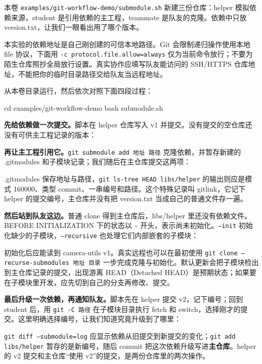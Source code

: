 本卷 \texttt{examples/git-workflow-demo/submodule.sh} 新建三份仓库：helper 模拟依赖来源，student 是引用依赖的主工程，teammate 是队友的克隆。依赖中只放 version.txt，让我们一眼看出用了哪个版本。
\begin{note}
本实验的依赖地址是自己刚创建的可信本地路径。Git 会限制递归操作使用本地 file 协议，下面用 \texttt{-c protocol.file.allow=always} 仅为当前命令放行；不要为陌生仓库照抄全局放行设置。真实协作应填写队友能访问的 SSH/HTTPS 仓库地址，不能把你的临时目录路径交给队友当远程地址。
\end{note}
\begin{example}[加入、克隆与更新相机工具子模块]
从本卷目录运行，然后依次对照下面四段过程：
\begin{tbash}
cd examples/git-workflow-demo
bash submodule.sh
\end{tbash}

\textbf{先给依赖做一次提交。}脚本在 helper 仓库写入 v1 并提交。没有提交的空仓库还没有可供主工程记录的版本：


\textbf{再让主工程引用它。}\texttt{git submodule add 地址 路径} 克隆依赖，并暂存新建的 .gitmodules 和子模块记录；我们随后在主仓库提交这两项：

.gitmodules 保存地址与路径，\texttt{git ls-tree HEAD libs/helper} 的输出则应是模式 160000、类型 commit、一串编号和路径。这个特殊记录叫 gitlink，它记下 helper 的提交编号，主仓库并没有把 version.txt 当成自己的普通文件存一遍。

\textbf{然后站到队友这边。}普通 clone 得到主仓库后，libs/helper 里还没有依赖文件。BEFORE INITIALIZATION 下的状态以 \texttt{-} 开头，表示尚未初始化。\texttt{--init} 初始化缺少的子模块，\texttt{--recursive} 也处理它们内部嵌套的子模块：

初始化后应能读到 camera-utils v1。真实远程也可以在最初使用 \texttt{git clone --recurse-submodules 地址 目录} 一步完成克隆与初始化。默认更新会把子模块检出到主仓库记录的提交，出现游离 HEAD（Detached HEAD）是预期状态；如果要在子模块里开发，应先切到自己的分支再修改、提交。

\textbf{最后升级一次依赖，再通知队友。}脚本先在 helper 提交 v2，记下编号；回到 student 后，用 \texttt{git -C 路径} 在子模块目录执行 fetch 和 switch，选择刚才的提交。这里明确选择编号，让我们知道究竟升级到了哪里：

\texttt{git diff --submodule=log} 应显示依赖从旧提交到新提交的变化；\texttt{git add libs/helper} 暂存的是新编号，随后 commit 把这次依赖升级写进\textbf{主仓库}。helper 的 v2 提交和主仓库“使用 v2”的提交，是两份仓库里的两次操作。


\end{example}
